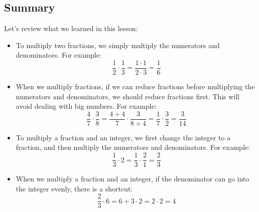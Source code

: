\subsection{Summary}
Let's review what we learned in this lesson:
\begin{itemize}
\item To multiply two fractions, we simply multiply the numerators and  denominators. For example: 
\[ \frac{1}{2} \cdot \frac{1}{3}=\frac{1\cdot1}{2\cdot3}=\frac{1}{6} \]
\item When we multiply fractions, if we can reduce fractions before multiplying the numerators and denominators, we should reduce fractions first. This will avoid dealing with big numbers. For example:
\[ \frac{4}{7} \cdot \frac{3}{8} = \frac{4\div4}{7} \cdot \frac{3}{8\div4} = \frac{1}{7} \cdot \frac{3}{2} = \frac{3}{14} \]
\item To multiply a fraction and an integer, we first change the integer to a fraction, and then multiply the numerators and denominators. For example:
\[ \frac{1}{3} \cdot 2 = \frac{1}{3} \cdot \frac{2}{1} = \frac{2}{3} \]
\item When we multiply a fraction and an integer, if the denominator can go into the integer evenly, there is a shortcut:
\[ \frac{2}{3} \cdot 6 = 6 \div 3 \cdot 2 = 2 \cdot 2 = 4 \]
\end{itemize}

